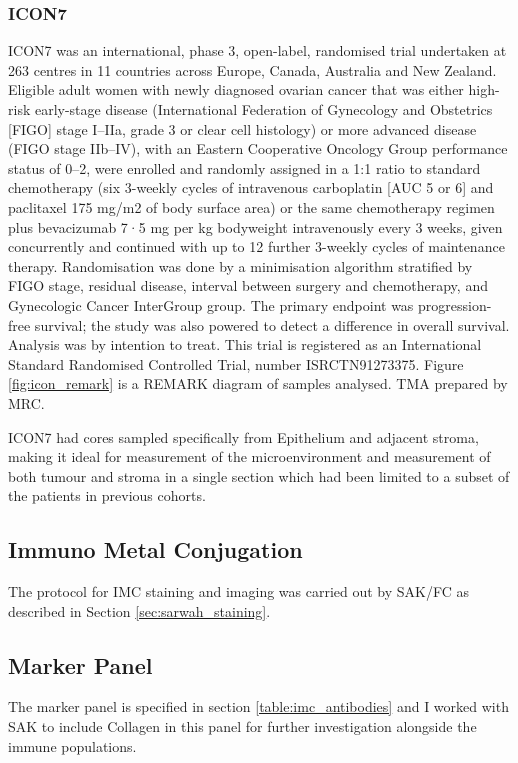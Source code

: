 \subsubsection{ICON7}
ICON7 was an international, phase 3, open-label, randomised trial undertaken at 263 centres in 11 countries across Europe, Canada, Australia and New Zealand. Eligible adult women with newly diagnosed ovarian cancer that was either high-risk early-stage disease (International Federation of Gynecology and Obstetrics [FIGO] stage I–IIa, grade 3 or clear cell histology) or more advanced disease (FIGO stage IIb–IV), with an Eastern Cooperative Oncology Group performance status of 0–2, were enrolled and randomly assigned in a 1:1 ratio to standard chemotherapy (six 3-weekly cycles of intravenous carboplatin [AUC 5 or 6] and paclitaxel 175 mg/m2 of body surface area) or the same chemotherapy regimen plus bevacizumab 7·5 mg per kg bodyweight intravenously every 3 weeks, given concurrently and continued with up to 12 further 3-weekly cycles of maintenance therapy. Randomisation was done by a minimisation algorithm stratified by FIGO stage, residual disease, interval between surgery and chemotherapy, and Gynecologic Cancer InterGroup group. The primary endpoint was progression-free survival; the study was also powered to detect a difference in overall survival. Analysis was by intention to treat. This trial is registered as an International Standard Randomised Controlled Trial, number ISRCTN91273375\cite{Perren2011Dec, BibEntry2020Jan}. Figure \ref{fig:icon_remark} is a REMARK diagram of samples analysed. TMA prepared by MRC.

ICON7 had cores sampled specifically from Epithelium and adjacent stroma, making it ideal for measurement of the microenvironment and measurement of both tumour and stroma in a single section which had been limited to a subset of the patients in previous cohorts.

\subsection{Immuno Metal Conjugation}
The protocol for IMC staining and imaging was carried out by SAK/FC as described in Section \ref{sec:sarwah_staining}.

\subsection{Marker Panel}
The marker panel is specified in section \ref{table:imc_antibodies} and I worked with SAK to include Collagen in this panel for further investigation alongside the immune populations. 


